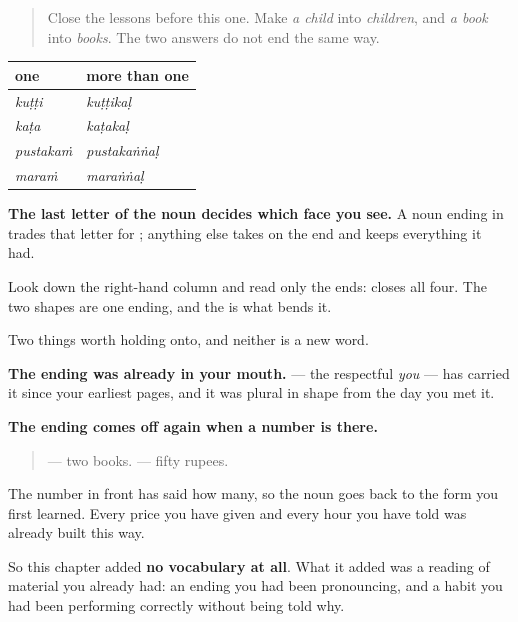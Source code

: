 \label{lesson:ML-R93-plural-recall}



\begin{quote}
Close the lessons before this one. Make \emph{a child} into \emph{children}, and \emph{a book} into \emph{books}. The two answers do not end the same way.
\end{quote}

\begin{grammarlens}[title={Grammar Lens: one ending, wearing two faces}]
\noindent
\begin{tabularx}{\linewidth}{@{}>{\raggedright\arraybackslash}X>{\raggedright\arraybackslash}X@{}}
\toprule
\textbf{one} & \textbf{more than one} \\
\midrule
\textbf{\ml{കുട്ടി}} \emph{kuṭṭi} & \textbf{\ml{കുട്ടികൾ}} \emph{kuṭṭikaḷ} \\
\textbf{\ml{കട}} \emph{kaṭa} & \textbf{\ml{കടകൾ}} \emph{kaṭakaḷ} \\
\textbf{\ml{പുസ്തകം}} \emph{pustakaṁ} & \textbf{\ml{പുസ്തകങ്ങൾ}} \emph{pustakaṅṅaḷ} \\
\textbf{\ml{മരം}} \emph{maraṁ} & \textbf{\ml{മരങ്ങൾ}} \emph{maraṅṅaḷ} \\
\bottomrule
\end{tabularx}

\textbf{The last letter of the noun decides which face you see.} A noun ending in \textbf{} trades that letter for \textbf{}; anything else takes \textbf{} on the end and keeps everything it had.

Look down the right-hand column and read only the ends: \textbf{} closes all four. The two shapes are one ending, and the \textbf{} is what bends it.
\end{grammarlens}

\begin{grammarlens}[title={What you've built}]
Two things worth holding onto, and neither is a new word.

\textbf{The ending was already in your mouth.} \textbf{} — the respectful \emph{you} — has carried it since your earliest pages, and it was plural in shape from the day you met it.

\textbf{The ending comes off again when a number is there.}

\begin{quote}
\textbf{ } — two books. \textbf{ } — fifty rupees.
\end{quote}

The number in front has said how many, so the noun goes back to the form you first learned. Every price you have given and every hour you have told was already built this way.

So this chapter added \textbf{no vocabulary at all}. What it added was a reading of material you already had: an ending you had been pronouncing, and a habit you had been performing correctly without being told why.
\end{grammarlens}

